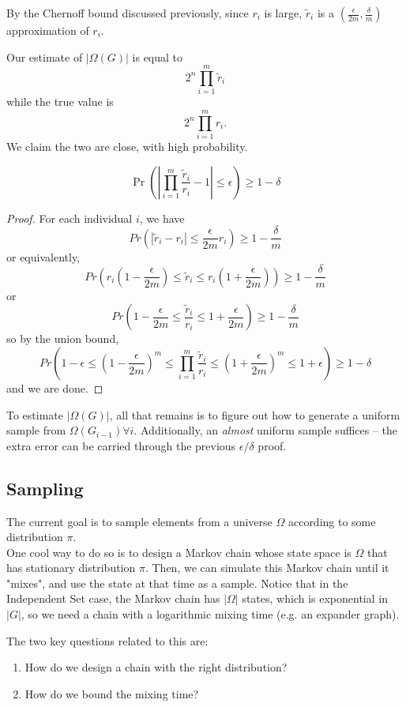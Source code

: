 By the Chernoff bound discussed previously, since $r_i$ is large, $\tilde r_i$ is a $(\frac{\epsilon}{2m}, \frac{\delta}{m})$ approximation of $r_i$.

Our estimate of $|\Omega(G)|$ is equal to
\[ 2^n \prod_{i=1}^m \tilde r_i \]
while the true value is
\[ 2^n \prod_{i=1}^m r_i.\]
We claim the two are close, with high probability.

\begin{claim}
\[ \Pr\left(|\prod_{i=1}^m \frac{\tilde r_i}{r_i} - 1| \leq \epsilon\right) \geq 1 - \delta \]
\end{claim}

\begin{proof}
For each individual $i$, we have
\[Pr\left( |\tilde r_i - r_i | \leq \frac{\epsilon}{2m}r_i\right) \geq 1 - \frac{\delta}{m}\]
or equivalently,
\[Pr\left( r_i(1-\frac{\epsilon}{2m}) \leq \tilde r_i \leq r_i(1+\frac{\epsilon}{2m})\right) \geq 1 - \frac{\delta}{m} \]
or
\[Pr\left(1 - \frac{\epsilon}{2m} \leq \frac{\tilde r_i}{r_i} \leq 1 + \frac{\epsilon}{2m}\right) \geq 1 - \frac{\delta}{m} \]
so by the union bound,
\[Pr\left(1 - \epsilon \leq (1 - \frac{\epsilon}{2m})^m \leq \prod_{i=1}^m \frac{\tilde r_i}{r_i} \leq (1 + \frac{\epsilon}{2m})^m \leq 1 + \epsilon\right) \geq 1 - \delta \]
and we are done.
\end{proof}

To estimate $|\Omega(G)|$, all that remains is to figure out how to generate a uniform sample from $\Omega(G_{i-1}) \forall i$.
Additionally, an \emph{almost} uniform sample suffices -- the extra error can be carried through the previous $\epsilon/\delta$ proof.

\subsection{Sampling}
The current goal is to sample elements from a universe $\Omega$ according to some distribution $\pi$. \\
  One cool way to do so is to design a Markov chain whose state space is $\Omega$ that has stationary distribution $\pi$. Then, we can simulate this Markov chain until it "mixes", and use the state at that time as a sample. Notice that in the Independent Set case, the Markov chain has $|\Omega|$ states, which is exponential in $|G|$, so we need a chain with a logarithmic mixing time (e.g. an expander graph).

The two key questions related to this are:
\begin{enumerate}
\item How do we design a chain with the right distribution?
\item How do we bound the mixing time?
\end{enumerate}

